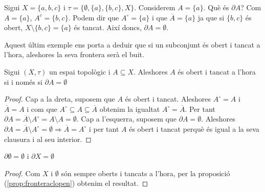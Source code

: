 \documentclass[../main.tex]{subfiles}
\begin{document}
\begin{ej}
\label{ej:frontera4} Sigui $X = \{a,b,c\}$ i $\tau = \{\emptyset,\{a\},\{b,c\},X\}$. Considerem $A = \{a\}$. Què és $\partial A$? Com $A = \{a\}$, $A^c = \{b,c\}$. Podem dir que $A^\circ = \{a\}$ i que $\overline{A} = \{a\}$ ja que si $\{b,c\}$ és obert, $X\setminus\{b,c\} = \{a\}$ és tancat. Així doncs, $\partial A = \emptyset$.
\end{ej}

Aquest últim exemple ens porta a deduir que si un subconjunt és obert i tancat a l'hora, aleshores la seva frontera serà el buit.

\begin{prop}
\label{prop:fronteraclopen} Sigui $(X,\tau)$ un espai topològic i $A\subseteq X$. Aleshores $A$ és obert i tancat a l'hora si i només si $\partial A=\emptyset$
\end{prop}
\begin{proof}
Cap a la dreta, suposem que $A$ és obert i tancat. Aleshores $A^\circ = A$ i $\overline{A} = A$ i com que $A^\circ\subseteq A\subseteq \overline{A}$ obtenim la igualtat $A^\circ=\overline{A}$. Per tant $\partial A = \overline{A}\setminus A^\circ = A\setminus A = \emptyset$. Cap a l'esquerra, suposem que $\partial A = \emptyset$. Aleshores $\partial A = \overline{A}\setminus A^\circ=\emptyset\Rightarrow \overline{A}= A^\circ$ i per tant $A$ és obert i tancat perquè és igual a la seva clausura i al seu interior.
\end{proof}

\begin{coro}
\label{coro:fronteradelbuit} $\partial \emptyset = \emptyset$ i $\partial X = \emptyset$
\end{coro}
\begin{proof}
Com $X$ i $\emptyset$ són sempre oberts i tancats a l'hora, per la proposició (\ref{prop:fronteraclopen}) obtenim el resultat.
\end{proof}
\end{document}
